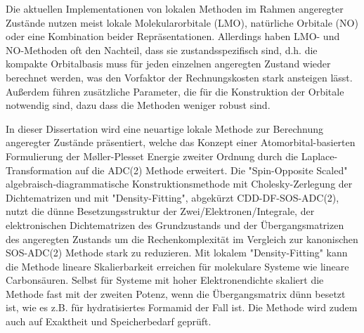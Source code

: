 Die aktuellen Implementationen von lokalen Methoden im Rahmen angeregter Zustände nutzen meist lokale Molekularorbitale (LMO), natürliche Orbitale (NO) oder eine Kombination beider Repräsentationen.
Allerdings haben LMO- und NO-Methoden oft den Nachteil, dass sie zustandsspezifisch sind, d.h. die kompakte Orbitalbasis muss für jeden einzelnen angeregten Zustand wieder berechnet werden, was den Vorfaktor der Rechnungskosten stark ansteigen lässt. 
Au{\ss}erdem führen zusätzliche Parameter, die für die Konstruktion der Orbitale notwendig sind, dazu dass die Methoden weniger robust sind. 

In dieser Dissertation wird eine neuartige lokale Methode zur Berechnung angeregter Zustände präsentiert, welche das Konzept einer Atomorbital-basierten Formulierung der M{\o}ller-Plesset Energie zweiter Ordnung durch die Laplace-Transformation auf die ADC(2) Methode erweitert.
Die "{}Spin-Opposite Scaled"{} algebraisch-diagrammatische Konstruktionsmethode mit Cholesky-Zerlegung der Dichtematrizen und mit "{}Density-Fitting"{}, abgekürzt CDD-DF-SOS-ADC(2), nutzt die dünne Besetzungsstruktur der Zwei\-/Elektronen\-/Integrale, der elektronischen Dichtematrizen des Grundzustands und der Übergangsmatrizen des angeregten Zustands um die Rechenkomplexität im Vergleich zur kanonischen SOS-ADC(2) Methode stark zu reduzieren.
Mit lokalem "{}Density-Fitting"{} kann die Methode lineare Skalierbarkeit erreichen für molekulare Systeme wie lineare Carbonsäuren. 
Selbst für Systeme mit hoher Elektronendichte skaliert die Methode fast mit der zweiten Potenz, wenn die Übergangsmatrix dünn besetzt ist, wie es z.B. für hydratisiertes Formamid der Fall ist.
Die Methode wird zudem auch auf Exaktheit und Speicherbedarf geprüft. 

